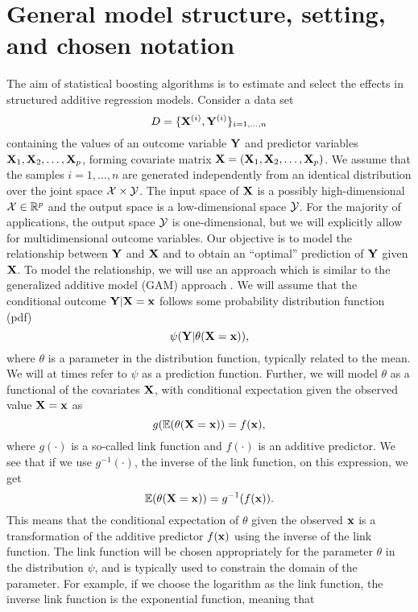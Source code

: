 \section{General model structure, setting, and chosen notation} %
The aim of statistical boosting algorithms is to estimate and select the effects in structured additive regression models. Consider a data set
\begin{equation}
    D=\{\mathbf{X}^{(i)},\mathbf{Y}^{(i)}\}_{i=1,\ldots,n}
\end{equation}
containing the values of an outcome variable $\mathbf{Y}$ and predictor variables $\mathbf{X}_1, \mathbf{X}_2,\ldots,\mathbf{X}_p$, forming covariate matrix $\mathbf{X}=(\mathbf{X}_1, \mathbf{X}_2,\ldots,\mathbf{X}_p)$. We assume that the samples $i=1,\ldots,n$ are generated independently from an identical distribution over the joint space $\mathcal{X}\times\mathcal{Y}$. The input space of $\mathbf{X}$ is a possibly high-dimensional $\mathcal{X}\in\mathbb{R}^p$ and the output space is a low-dimensional space $\mathcal{Y}$. For the majority of applications, the output space $\mathcal{Y}$ is one-dimensional, but we will explicitly allow for multidimensional outcome variables. Our objective is to model the relationship between $\mathbf{Y}$ and $\mathbf{X}$ and to obtain an ``optimal'' prediction of $\mathbf{Y}$ given $\mathbf{X}$. To model the relationship, we will use an approach which is similar to the generalized additive model (GAM) approach \citep{gam-book}. We will assume that the conditional outcome $\mathbf{Y}|\mathbf{X}=\mathbf{x}$ follows some probability distribution function (pdf)
\begin{equation}\label{eq:psi}
    \psi(\mathbf{Y}|\theta(\mathbf{X}=\mathbf{x})),
\end{equation}
where $\theta$ is a parameter in the distribution function, typically related to the mean. We will at times refer to $\psi$ as a prediction function. Further, we will model $\theta$ as a functional of the covariates $\mathbf{X}$, with conditional expectation given the observed value $\mathbf{X}=\mathbf{x}$ as
\begin{equation}
    g(\mathbb{E}(\theta(\mathbf{X}=\mathbf{x}))=f(\mathbf{x}),
\end{equation}
where $g(\cdot)$ is a so-called link function and $f(\cdot)$ is an additive predictor. We see that if we use $g^{-1}(\cdot)$, the inverse of the link function, on this expression, we get
\begin{equation}
    \mathbb{E}(\theta(\mathbf{X}=\mathbf{x}))=g^{-1}(f(\mathbf{x})).
\end{equation}
This means that the conditional expectation of $\theta$ given the observed $\mathbf{x}$ is a transformation of the additive predictor $f(\mathbf{x})$ using the inverse of the link function. The link function will be chosen appropriately for the parameter $\theta$ in the distribution $\psi$, and is typically used to constrain the domain of the parameter. For example, if we choose the logarithm as the link function, the inverse link function is the exponential function, meaning that
